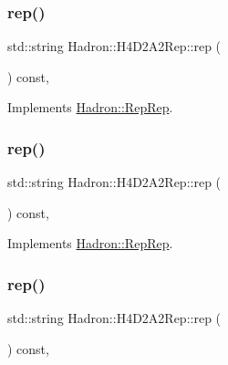 \subsubsection{\texorpdfstring{rep()}{rep()}\hspace{0.1cm}{\footnotesize\ttfamily [2/5]}}
{\footnotesize\ttfamily std\+::string Hadron\+::\+H4\+D2\+A2\+Rep\+::rep (\begin{DoxyParamCaption}{ }\end{DoxyParamCaption}) const\hspace{0.3cm}{\ttfamily [inline]}, {\ttfamily [virtual]}}



Implements \mbox{\hyperlink{structHadron_1_1RepRep_ab3213025f6de249f7095892109575fde}{Hadron\+::\+Rep\+Rep}}.

\mbox{\label{structHadron_1_1H4D2A2Rep_a144c2d98d82e71971a810610f10199d3}} 
\subsubsection{\texorpdfstring{rep()}{rep()}\hspace{0.1cm}{\footnotesize\ttfamily [3/5]}}
{\footnotesize\ttfamily std\+::string Hadron\+::\+H4\+D2\+A2\+Rep\+::rep (\begin{DoxyParamCaption}{ }\end{DoxyParamCaption}) const\hspace{0.3cm}{\ttfamily [inline]}, {\ttfamily [virtual]}}



Implements \mbox{\hyperlink{structHadron_1_1RepRep_ab3213025f6de249f7095892109575fde}{Hadron\+::\+Rep\+Rep}}.

\mbox{\label{structHadron_1_1H4D2A2Rep_a144c2d98d82e71971a810610f10199d3}} 
\subsubsection{\texorpdfstring{rep()}{rep()}\hspace{0.1cm}{\footnotesize\ttfamily [4/5]}}
{\footnotesize\ttfamily std\+::string Hadron\+::\+H4\+D2\+A2\+Rep\+::rep (\begin{DoxyParamCaption}{ }\end{DoxyParamCaption}) const\hspace{0.3cm}{\ttfamily [inline]}, {\ttfamily [virtual]}}



